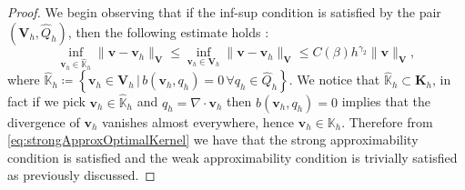 \documentclass[USenglish]{article}
\theoremstyle{dgthm}
\theoremstyle{dgdef}
\let\vec\bm
\newcommand\norm[1]{\lVert#1\rVert}
\begin{document}
\begin{proof}
  We begin observing that if the inf-sup condition is satisfied by the pair $(\vec{V}_h,\hat{Q}_h)$, then the following estimate holds \cite[Proposition 5.1.3]{BBF}:
  \begin{equation}
    \underset{\vec{v}_h\in \hat{\mathbb{K}}_h}{\inf}\norm{\vec{v}-\vec{v}_h}_{\vec{V}}\leq \underset{\vec{v}_h\in \vec{V}_h}{\inf}\norm{\vec{v}-\vec{v}_h}_{\vec{V}}\leq C(\beta)h^{\gamma_2}\norm{\vec{v}}_{\vec{V}},\label{eq:strongApproxOptimalKernel}
  \end{equation}
  where $\hat{\mathbb{K}}_h\coloneqq \left\{\vec{v}_h\in \vec{V}_h\,|\, b(\vec{v}_h,q_h)=0\, \forall q_h\in \hat{Q}_h\right\}$.
  We notice that $\hat{\mathbb{K}}_h\subset \vec{K}_h$, in fact if we pick $\vec{v}_h\in \hat{\mathbb{K}}_h$ and $q_h = \nabla\cdot \vec{v}_h$ then $b(\vec{v}_h,q_h)=0$ implies that the divergence of $\vec{v}_h$ vanishes almost everywhere, hence $\vec{v}_h\in \mathbb{K}_h$.
  Therefore from \eqref{eq:strongApproxOptimalKernel} we have that the strong approximability condition is satisfied and the weak approximability condition is trivially satisfied as previously discussed.
\end{proof}
\end{document}
